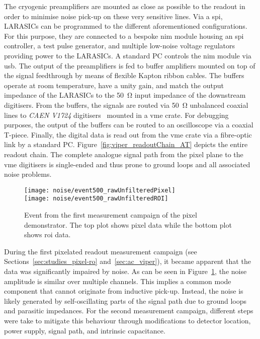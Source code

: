 The cryogenic preamplifiers are mounted as close as possible to the readout in order to minimise noise pick-up on these very sensitive lines.
Via a \gls{spi}, LARASICs can be programmed to the different aforementioned configurations.
For this purpose, they are connected to a bespoke \gls{nim} module housing an \gls{spi} controller, a test pulse generator, and multiple low-noise voltage regulators providing power to the LARASICs.
A standard PC controls the \gls{nim} module via \gls{usb}.
The output of the preamplifiers is fed to buffer amplifiers mounted on top of the signal feedthrough by means of flexible Kapton ribbon cables.
The buffers operate at room temperature, have a unity gain, and match the output impedance of the LARASICs to the \SI{50}{\ohm} input impedance of the downstream digitisers.
From the buffers, the signals are routed via \SI{50}{\ohm} unbalanced coaxial lines to \emph{CAEN V1724} digitisers~\cite{caen_adc} mounted in a \gls{vme} crate.
For debugging purposes, the output of the buffers can be routed to an oscilloscope via a coaxial T-piece.
Finally, the digital data is read out from the \gls{vme} crate via a fibre-optic link by a standard PC.
Figure~\ref{fig:viper_readoutChain_AT} depicts the entire readout chain.
The complete analogue signal path from the pixel plane to the \gls{vme} digitisers is single-ended and thus prone to ground loops and all associated noise problems.

\begin{figure}[htb]
	\centering
	\texttt{[image: noise/event500\_rawUnfilteredPixel]}\\
	\texttt{[image: noise/event500\_rawUnfilteredROI]}
	\caption[Event from first pixel demonstrator measurement campaign]{%
		Event from the first measurement campaign of the pixel demonstrator.
		The top plot shows pixel data while the bottom plot shows \acrshort{roi} data.
	}
	\label{fig:electronics_event-run1}
\end{figure}

During the first pixelated readout measurement campaign (see Sections~\ref{sec:studies_pixel-ro} and~\ref{sec:ac_viper}), it became apparent that the data was significantly impaired by noise.
As can be seen in Figure~\ref{fig:electronics_event-run1}, the noise amplitude is similar over multiple channels.
This implies a common mode component that cannot originate from inductive pick-up.
Instead, the noise is likely generated by self-oscillating parts of the signal path due to ground loops and parasitic impedances.
For the second measurement campaign, different steps were take to mitigate this behaviour through modifications to detector location, power supply, signal path, and intrinsic capacitance.

